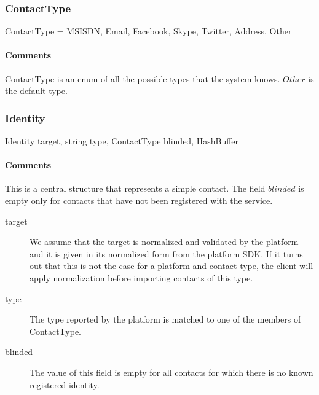 \documentclass[a4paper,10pt]{article}
\begin{document}
\subsubsection{ContactType}
\begin{verbbox}
ContactType = { MSISDN, Email, Facebook, Skype, Twitter, Address,
                Other }
\end{verbbox}
\begin{center}
\theverbbox
\end{center}

\begin{inparaitem}[ ]
 \item \infrastructure
\end{inparaitem}

\paragraph*{Comments}
ContactType is an enum of all the possible types that the system knows. $Other$ is the default type.

\subsubsection{Identity}

\begin{verbbox}
Identity
{
  target, string
  type, ContactType
  blinded, HashBuffer
}
\end{verbbox}
\begin{center}
\theverbbox
\end{center}

\begin{inparaitem}[ ]
 \item \infrastructure
\end{inparaitem}

\paragraph*{Comments}
This is a central structure that represents a simple contact. The field $blinded$ is empty only for contacts that have not been registered with the service.

\SpecialItem
\begin{description}
 \item[target] We assume that the target is normalized and validated by the platform and it is given in its normalized form from the platform SDK. If it turns out that this is not 
the case for a platform and contact type, the client will apply normalization before importing contacts of this type.
 \item[type] The type reported by the platform is matched to one of the members of ContactType.
 \item[blinded] The value of this field is empty for all contacts for which there is no known registered identity.
\end{description}
\end{document}
